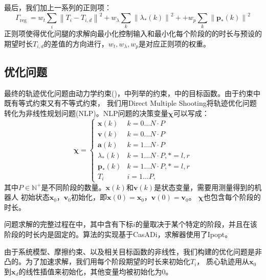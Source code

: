最后，我们加上一系列的正则项：
\begin{equation}
    \label{equ:cost_4}
    \Gamma_{\text {reg }}=  w_t \sum_i\left\|T_i-T_{i, d}\right\|^2+w_\lambda \sum_k\left\|\lambda_*(k)\right\|^2+ 
        +w_p \sum_k\left\|\boldsymbol{p}_*(k)\right\|^2
\end{equation}
正则项使得优化问腿的求解向最小化控制输入和最小化每个阶段的的时长与预设的期望时长$T_{i, d}$的差值的方向进行，$w_t, w_\lambda, w_p$是对应正则项的权重。

\subsection{优化问题}
最终的轨迹优化问题由动力学约束()，中列举的约束，中的目标函数。由于约束中既有等式约束又有不等式约束，
我们用Direct Multiple Shooting将轨迹优化问题转化为非线性规划问题(NLP)。NLP问题的决策变量$\boldsymbol{\chi}$可以写成：
\begin{equation}
    \label{equ:decision_variable}
    \boldsymbol{\chi} = \begin{cases}\boldsymbol{x}(k) & k=0 \ldots N \cdot P \\ \boldsymbol{v}(k) & k=0 \ldots N \cdot P \\ \boldsymbol{a}(k) & k=1 \ldots N \cdot P \\ \lambda_*(k) & k=1 \ldots N \cdot P, *=l, r \\ \boldsymbol{p}_*(k) & k=1 \ldots N \cdot P, *=l, r \\ T_i & i=1 \ldots P,\end{cases}
\end{equation}
其中$P \in \mathbb{N}^+$是不同阶段的数量。$\boldsymbol{x}(k)$和$\boldsymbol{v}(k)$是状态变量，需要用测量得到的机器人
初始状态$\boldsymbol{x}_0$，$\boldsymbol{v}_0$初始化，即$\boldsymbol{x}(0)=\boldsymbol{x}_0$，$\boldsymbol{v}(0)=\boldsymbol{v}_0$。
$\boldsymbol{\chi}$也包含每个阶段的时长。

问题求解的完整过程在中，其中含有下标$i$的量取决于某个特定的阶段，并且在该阶段的时长内是固定的。算法的实现基于CasADi\cite{andersson2019casadi}，求解器使用了Ipopt。

由于系统模型、摩擦约束、以及相关目标函数的非线性，我们构建的优化问题是非凸的。为了加速求解，我们用每个阶段期望的时长来初始化$T_i$，
质心轨迹用从$\boldsymbol{x}_0$到$\boldsymbol{x}_d$的线性插值来初始化，其他变量均被初始化为0。


